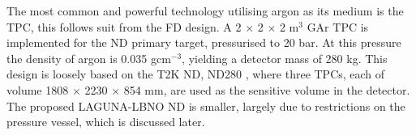 
The most common and powerful technology utilising argon as its medium is the TPC, this follows suit from the FD design. A 2 $\times$ 2 $\times$ 2 m$^{3}$ GAr TPC is implemented for the ND primary target, pressurised to 20 bar. At this pressure the density of argon is 0.035 gcm$^{-3}$, yielding a detector mass of 280 kg. This design is loosely based on the T2K ND, ND280 \cite{internalT2K}, where three TPCs, each of volume 1808 $\times$ 2230 $\times$ 854 mm, are used as the sensitive volume in the detector. The proposed LAGUNA-LBNO ND is smaller, largely due to restrictions on the pressure vessel, which is discussed later. 


